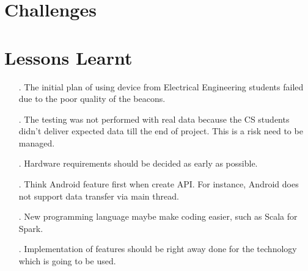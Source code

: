 \documentclass[prodmode,acmtosem]{acmsmall} %
\begin{document}
\section{Challenges}
\section{Lessons Learnt}
\begin{itemize}
\item[.] The initial plan of using device from Electrical Engineering students failed due to the poor quality of the beacons.\\
\item[.] The testing was not performed with real data because the CS students didn't deliver expected data till the end of project. This is a risk need to be managed.\\
\item[.] Hardware requirements should be decided as early as possible.\\
\item[.] Think Android feature first when create API. For instance, Android does not support data transfer via main thread.\\
\item[.] New programming language maybe make coding easier, such as Scala for Spark.\\
\item[.] Implementation of features should be right away done for the technology which is going to be used.\\
\end{itemize}
\end{document}
